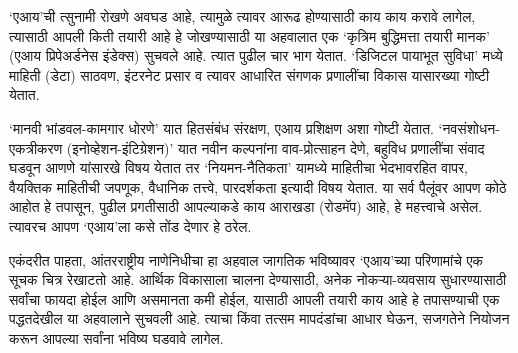 ‘एआय’ची त्सुनामी रोखणे अवघड आहे, त्यामुळे त्यावर आरूढ होण्यासाठी काय काय करावे लागेल, त्यासाठी आपली किती तयारी आहे हे जोखण्यासाठी या अहवालात एक ‘कृत्रिम बुद्धिमत्ता तयारी मानक’ (एआय प्रिपेअर्डनेस इंडेक्स) सुचवले आहे. त्यात पुढील चार भाग येतात. ‘डिजिटल पायाभूत सुविधा’ मध्ये माहिती (डेटा) साठवण, इंटरनेट प्रसार व त्यावर आधारित संगणक प्रणालींचा विकास यासारख्या गोष्टी येतात.

‘मानवी भांडवल-कामगार धोरणे’ यात हितसंबंध संरक्षण, एआय प्रशिक्षण अशा गोष्टी येतात. ‘नवसंशोधन-एकत्रीकरण (इनोव्हेशन-इंटिग्रेशन)’ यात नवीन कल्पनांना वाव-प्रोत्साहन देणे, बहुविध प्रणालींचा संवाद घडवून आणणे यांसारखे विषय येतात तर ‘नियमन-नैतिकता’ यामध्ये माहितीचा भेदभावरहित वापर, वैयक्तिक माहितीची जपणूक, वैधानिक तत्त्वे, पारदर्शकता इत्यादी विषय येतात. या सर्व पैलूंवर आपण कोठे आहोत हे तपासून, पुढील प्रगतीसाठी आपल्याकडे काय आराखडा (रोडमॅप) आहे, हे महत्त्वाचे असेल. त्यावरच आपण ‘एआय’ला कसे तोंड देणार हे ठरेल.

एकंदरीत पाहता, आंतरराष्ट्रीय नाणेनिधीचा हा अहवाल जागतिक भविष्यावर ‘एआय’च्या परिणामांचे एक सूचक चित्र रेखाटतो आहे. आर्थिक विकासाला चालना देण्यासाठी, अनेक नोकऱ्या-व्यवसाय सुधारण्यासाठी सर्वांचा फायदा होईल आणि असमानता कमी होईल, यासाठी आपली तयारी काय आहे हे तपासण्याची एक पद्धतदेखील या अहवालाने सुचवली आहे. त्याचा किंवा तत्सम मापदंडांचा आधार घेऊन, सजगतेने नियोजन करून आपल्या सर्वांना भविष्य घडवावे लागेल.

